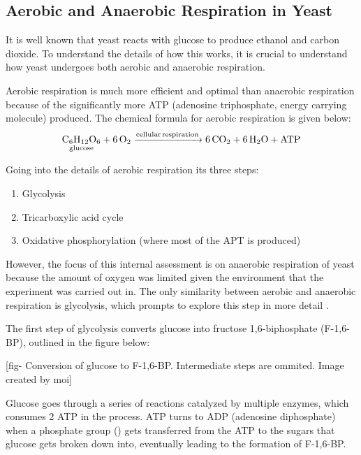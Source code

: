 \documentclass{article}
\begin{document}
\subsection{Aerobic and Anaerobic Respiration in Yeast}
It is well known that yeast reacts with glucose to produce ethanol and carbon dioxide. To understand the details of how this works, it is crucial to understand how yeast undergoes both aerobic and anaerobic respiration.

\medskip

Aerobic respiration is much more efficient and optimal than anaerobic respiration because of the significantly more ATP (adenosine triphosphate, energy carrying molecule) produced. The chemical formula for aerobic respiration is given below:
\begin{equation}
    \ce{\underset{\text{glucose}}{\ce{C6H12O6}} + 6O2 ->[cellular respiration] 6CO2 + 6H2O + ATP}
\end{equation}

Going into the details of aerobic respiration its three steps:
\begin{enumerate}[topsep=\parskip, noitemsep]
    \item Glycolysis
    \item Tricarboxylic acid cycle
    \item Oxidative phosphorylation (where most of the APT is produced)
\end{enumerate}


\medskip

However, the focus of this internal assessment is on anaerobic respiration of yeast because the amount of oxygen was limited given the environment that the experiment was carried out in. The only similarity between aerobic and anaerobic respiration is glycolysis, which prompts to explore this step in more detail \parencite{ref}.

\medskip

The first step of glycolysis converts glucose into fructose 1,6-biphosphate (F-1,6-BP), outlined in the figure below:

\medskip

[fig- Conversion of glucose to F-1,6-BP. Intermediate steps are ommited. Image created by moi]

\medskip

Glucose goes through a series of reactions catalyzed by multiple enzymes, which consumes 2 ATP in the process. ATP turns to ADP (adenosine diphosphate) when a phosphate group () gets transferred from the ATP to the sugars that glucose gets broken down into, eventually leading to the formation of F-1,6-BP.
\end{document}
